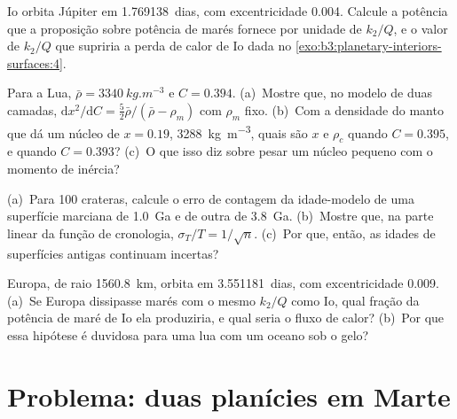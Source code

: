 \begin{exercise}[$\star\star$]\label{exo:b3:planetary-interiors-surfaces:9}
Io orbita Júpiter em \num{1.769138}~dias, com excentricidade 0.004.
Calcule a potência que a proposição sobre potência de marés fornece por unidade de $k_2/Q$,
e o valor de $k_2/Q$ que supriria a perda de calor de Io
dada no \cref{exo:b3:planetary-interiors-surfaces:4}.
\end{exercise}

\begin{exercise}[$\star\star\star$]\label{exo:b3:planetary-interiors-surfaces:10}
Para a Lua, $\bar\rho = \qty{3340}{kg.m^{-3}}$ e $C = 0.394$.
(a)~Mostre que, no modelo de duas camadas, $\mathrm dx^2/\mathrm dC =
\tfrac52\bar\rho/(\bar\rho - \rho_m)$ com $\rho_m$ fixo. (b)~Com a
densidade do manto que dá um núcleo de $x = 0.19$, \qty{3288}{kg.m^{-3}},
quais são $x$ e $\rho_c$ quando $C = 0.395$, e quando $C = 0.393$?
(c)~O que isso diz sobre pesar um núcleo pequeno com o momento de
inércia?
\end{exercise}

\begin{exercise}[$\star\star\star$]\label{exo:b3:planetary-interiors-surfaces:11}
(a)~Para 100 crateras, calcule o erro de contagem da idade-modelo de uma
superfície marciana de \qty{1.0}{Ga} e de outra de \qty{3.8}{Ga}.
(b)~Mostre que, na parte linear da função de cronologia, $\sigma_T/T =
1/\sqrt n$. (c)~Por que, então, as idades de superfícies antigas continuam incertas?
\end{exercise}

\begin{exercise}[$\star\star\star$]\label{exo:b3:planetary-interiors-surfaces:12}
Europa, de raio \qty{1560.8}{km}, orbita em \num{3.551181}~dias, com
excentricidade 0.009. (a)~Se Europa dissipasse marés com o mesmo $k_2/Q$
como Io, qual fração da potência de maré de Io ela produziria, e qual seria o fluxo de calor?
(b)~Por que essa hipótese é duvidosa para uma lua com um oceano sob o gelo?
\end{exercise}

\section{Problema: duas planícies em Marte}

